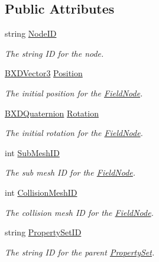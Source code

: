 \subsection*{Public Attributes}
\begin{DoxyCompactItemize}
\item 
string \hyperlink{class_field_node_a7d4f3453f91c082b7d5604c6e1581425}{Node\+ID}
\begin{DoxyCompactList}\small\item\em The string ID for the node. \end{DoxyCompactList}\item 
\hyperlink{class_b_x_d_vector3}{B\+X\+D\+Vector3} \hyperlink{class_field_node_a884d35ceb35d10ea8643cc7e36be5ff9}{Position}
\begin{DoxyCompactList}\small\item\em The initial position for the \hyperlink{class_field_node}{Field\+Node}. \end{DoxyCompactList}\item 
\hyperlink{class_b_x_d_quaternion}{B\+X\+D\+Quaternion} \hyperlink{class_field_node_a39d5c7e9a136e334fd53b6e77a9964d4}{Rotation}
\begin{DoxyCompactList}\small\item\em The initial rotation for the \hyperlink{class_field_node}{Field\+Node}. \end{DoxyCompactList}\item 
int \hyperlink{class_field_node_ac77c2ba5af3848df490ac82bc1199d3d}{Sub\+Mesh\+ID}
\begin{DoxyCompactList}\small\item\em The sub mesh ID for the \hyperlink{class_field_node}{Field\+Node}. \end{DoxyCompactList}\item 
int \hyperlink{class_field_node_aad132e7c9b9f540962bcefb4bb5f138c}{Collision\+Mesh\+ID}
\begin{DoxyCompactList}\small\item\em The collision mesh ID for the \hyperlink{class_field_node}{Field\+Node}. \end{DoxyCompactList}\item 
string \hyperlink{class_field_node_ae1bc4426382f512a64980cd28a6f67cc}{Property\+Set\+ID}
\begin{DoxyCompactList}\small\item\em The string ID for the parent \hyperlink{struct_property_set}{Property\+Set}. \end{DoxyCompactList}\end{DoxyCompactItemize}


